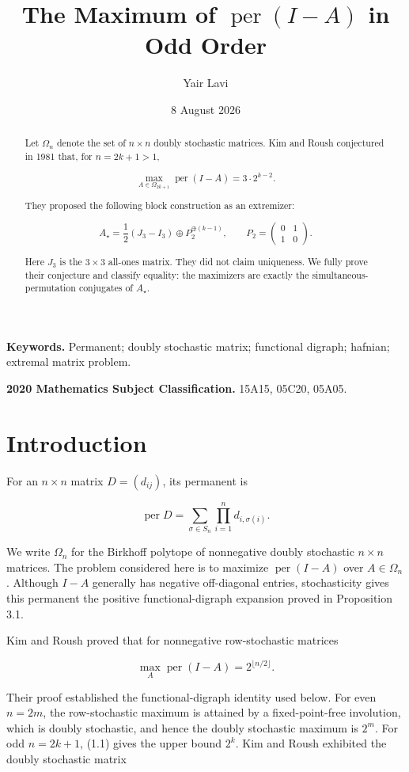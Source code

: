 \documentclass[11pt]{article}
\title{The Maximum of $\operatorname{per}(I-A)$ in Odd Order}
\author{Yair Lavi}
\date{8 August 2026}
\theoremstyle{remark}
\begin{document}
\maketitle

\begin{abstract}
Let $\Omega_n$ denote the set of $n\times n$ doubly stochastic
matrices. Kim and Roush conjectured in 1981 that, for $n=2k+1>1$,

\[
\max_{A\in\Omega_{2k+1}}\operatorname{per}(I-A)=3\cdot 2^{k-2}.
\]

They proposed the following block construction as an extremizer:

\[
A_\star=\frac12(J_3-I_3)\oplus P_2^{\oplus(k-1)},
\qquad
P_2=\begin{pmatrix}0&1\\1&0\end{pmatrix}.
\]

Here $J_3$ is the $3\times3$ all-ones matrix. They did not claim uniqueness.
We fully prove their conjecture and classify equality: the maximizers are
exactly the simultaneous-permutation conjugates of $A_\star$.
\end{abstract}

\noindent\textbf{Keywords.} Permanent; doubly stochastic matrix; functional digraph;
hafnian; extremal matrix problem.

\noindent\textbf{2020 Mathematics Subject Classification.} 15A15, 05C20, 05A05.

\section{Introduction}

For an $n\times n$ matrix $D=(d_{ij})$, its permanent is

\[
\operatorname{per}D=\sum_{\sigma\in S_n}\prod_{i=1}^n d_{i,\sigma(i)}.
\]

We write $\Omega_n$ for the Birkhoff polytope of nonnegative doubly
stochastic $n\times n$ matrices. The problem considered here is to maximize
$\operatorname{per}(I-A)$ over $A\in\Omega_n$. Although $I-A$ generally has
negative off-diagonal entries, stochasticity gives this permanent the positive
functional-digraph expansion proved in Proposition 3.1.

Kim and Roush \cite{kimroush1981} proved that for nonnegative row-stochastic matrices

\[
\max_A\operatorname{per}(I-A)=2^{\lfloor n/2\rfloor}.
\tag{1.1}
\]

Their proof established the functional-digraph identity used below. For even
$n=2m$, the row-stochastic maximum is attained by a fixed-point-free
involution, which is doubly stochastic, and hence the doubly stochastic
maximum is $2^m$. For odd $n=2k+1$, (1.1) gives the upper bound $2^k$.
Kim and Roush exhibited the doubly stochastic matrix
\end{document}
